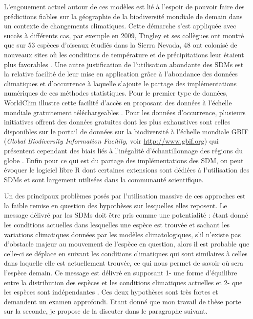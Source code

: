 L'engouement actuel autour de ces modèles est lié à l'espoir de pouvoir
faire des prédictions fiables sur la géographie de la biodiversité
mondiale de demain dans un contexte de changements climatiques. Cette
démarche s'est appliquée avec succès à différents cas, par exemple en
2009, Tingley et ses collègues ont montré que sur 53 espèces d'oiseaux
étudiés dans la Sierra Nevada, 48 ont colonisé de nouveaux sites où les
conditions de température et de précipitations leur étaient plus
favorables \citep{Tingley2009}. Une autre justification de l'utilisation
abondante des SDMs est la relative facilité de leur mise en application
grâce à l'abondance des données climatiques et d'occurrence à laquelle
s'ajoute le partage des implémentations numériques de ces méthodes
statistiques. Pour le premier type de données, WorldClim illustre cette
facilité d'accès en proposant des données à l'échelle mondiale
gratuitement téléchargeables \citep[voir
\url{http://worldclim.org}][]{Hijmans2005}. Pour les données
d'occurrence, plusieurs initiatives offrent des données gratuites dont
les plus exhaustives sont celles disponibles sur le portail de données
sur la biodiversité à l'échelle mondiale GBIF (\emph{Global Biodiversity
Information Facility}, voir \url{http://www.gbif.org}) qui présentent
cependant des biais liés à l'inégalité d'échantillonnage des régions du
globe \citep{Beck2014a}. Enfin pour ce qui est du partage des
implémentations des SDM, on peut évoquer le logiciel libre R
\citep{Rcoreteam2015} dont certaines extensions sont dédiées à
l'utilisation des SDMs et sont largement utilisées dans la communauté
scientifique.

Un des principaux problèmes posés par l'utilisation massive de ces
approches est la faible remise en question des hypothèses sur lesquelles
elles reposent. Le message délivré par les SDMs doit être pris comme une
potentialité : étant donné les conditions actuelles dans lesquelles une
espèce est trouvée et sachant les variations climatiques données par les
modèles climatologiques, s'il n'existe pas d'obstacle majeur au
mouvement de l'espèce en question, alors il est probable que celle-ci se
déplace en suivant les conditions climatiques qui sont similaires à
celles dans laquelle elle est actuellement trouvée, ce qui nous permet
de savoir où sera l'espèce demain. Ce message est délivré en supposant
1- une forme d'équilibre entre la distribution des espèces et les
conditions climatiques actuelles et 2- que les espèces sont
indépendantes \citep{Jeschke2008}. Ces deux hypothèses sont très fortes
et demandent un examen approfondi. Etant donné que mon travail de thèse
porte sur la seconde, je propose de la discuter dans le paragraphe
suivant.

